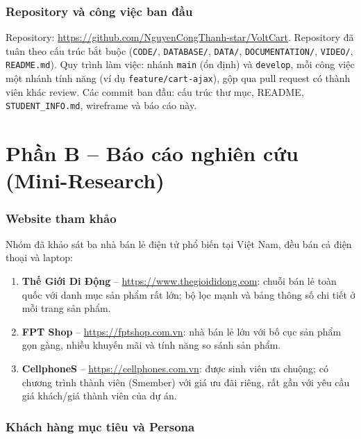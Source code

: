 \documentclass[12pt,a4paper]{article}   %
\newcommand{\RepoURL}{\url{https://github.com/NguyenCongThanh-star/VoltCart}}
\begin{document}
\section{Repository và công việc ban đầu}

Repository: \RepoURL. Repository đã tuân theo cấu trúc bắt buộc
(\texttt{CODE/}, \texttt{DATABASE/}, \texttt{DATA/}, \texttt{DOCUMENTATION/}, \texttt{VIDEO/},
\texttt{README.md}). Quy trình làm việc: nhánh \texttt{main} (ổn định) và \texttt{develop},
mỗi công việc một nhánh tính năng (ví dụ \texttt{feature/cart-ajax}), gộp qua pull request
có thành viên khác review. Các commit ban đầu: cấu trúc thư mục, README, \texttt{STUDENT\_INFO.md},
wireframe và báo cáo này.

\newpage
\part*{\large Phần B -- Báo cáo nghiên cứu (Mini-Research)}

\section{Website tham khảo}

Nhóm đã khảo sát ba nhà bán lẻ điện tử phổ biến tại Việt Nam, đều bán cả điện thoại và laptop:

\begin{enumerate}
  \item \textbf{Thế Giới Di Động} -- \url{https://www.thegioididong.com}:
        chuỗi bán lẻ toàn quốc với danh mục sản phẩm rất lớn; bộ lọc mạnh và bảng thông số
        chi tiết ở mỗi trang sản phẩm.
  \item \textbf{FPT Shop} -- \url{https://fptshop.com.vn}:
        nhà bán lẻ lớn với bố cục sản phẩm gọn gàng, nhiều khuyến mãi và tính năng so sánh sản phẩm.
  \item \textbf{CellphoneS} -- \url{https://cellphones.com.vn}:
        được sinh viên ưa chuộng; có chương trình thành viên (Smember) với giá ưu đãi riêng,
        rất gần với yêu cầu giá khách/giá thành viên của dự án.
\end{enumerate}

\section{Khách hàng mục tiêu và Persona}
\end{document}
